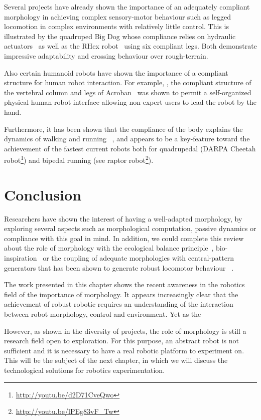 Several projects have already shown the importance of an adequately compliant morphology in achieving complex sensory-motor behaviour such as legged locomotion in complex environments with relatively little control.  This is illustrated by the quadruped Big Dog whose compliance relies on hydraulic actuators~\cite{raibert2008bigdog} as well as the RHex robot~\cite{saranli2001rhex} using six compliant legs. Both demonstrate impressive adaptability and crossing behaviour over rough-terrain.

\begin{figure}[tb]
\centering
    \hfil
    \caption{}
    \label{fig:compliant_robot}
\end{figure}

Also certain humanoid robots have shown the importance of a compliant structure for human robot interaction. For example,  , the compliant structure of the vertebral column and legs of Acroban~\cite{Ly2011bio} \cite{Oudeyer2011} was shown to permit a self-organized physical human-robot interface allowing non-expert users to lead the robot by the hand.

Furthermore, it has been shown that the compliance of the body explains the dynamics of walking and running~\cite{Geyer2006} \cite{iida2007bipedal}, and appears to be a key-feature toward the achievement of the fastest current robots both for quadrupedal (DARPA Cheetah robot\footnote{\url{http://youtu.be/d2D71CveQwo}}) and bipedal running (see raptor robot\footnote{\url{http://youtu.be/lPEg83vF_Tw}}).



\section{Conclusion} %

Researchers have shown the interest of having a well-adapted morphology, by exploring several aspects such as morphological computation, passive dynamics or compliance with this goal in mind. In addition, we could complete this review about the role of morphology with the ecological balance principle~\cite{pfeifer2005new}, bio-inspiration~\cite{scarfogliero2009use} \cite{pfeifer2007self} or the coupling of adequate morphologies with central-pattern generators that has been shown to generate robust locomotor behaviour~\cite{ijspeert2007swimming} \cite{steingrube2010self}.

The work presented in this chapter shows the recent awareness in the robotics field of the importance of morphology. It appears increasingly clear that the achievement of robust robotic requires an understanding of the interaction between robot morphology, control and environment. Yet as the

However, as shown in the diversity of projects, the role of morphology is still a research field open to exploration. For this purpose, an abstract robot is not sufficient and it is necessary to have a real robotic platform to experiment on. This will be the subject of the next chapter, in which we will discuss the technological solutions for robotics experimentation.


